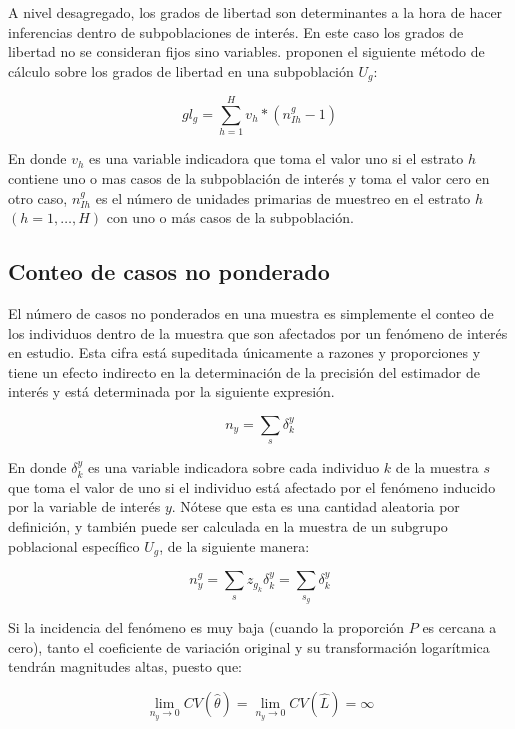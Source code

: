\documentclass[
  12pt,
]{book}
\begin{document}
A nivel desagregado, los grados de libertad son determinantes a la hora de hacer inferencias dentro de subpoblaciones de interés. En este caso los grados de libertad no se consideran fijos sino variables. \citet[p.~209]{Korn_Graubard_1999} proponen el siguiente método de cálculo sobre los grados de libertad en una subpoblación \(U_g\):

\[
gl_{g} = \sum_{h=1}^H v_h*(n_{Ih}^g - 1)
\]

En donde \(v_h\) es una variable indicadora que toma el valor uno si el estrato \(h\) contiene uno o mas casos de la subpoblación de interés y toma el valor cero en otro caso, \(n_{Ih}^g\) es el número de unidades primarias de muestreo en el estrato \(h\) \((h=1, \ldots, H)\) con uno o más casos de la subpoblación.

\hypertarget{conteo-de-casos-no-ponderado}{%
\subsection{Conteo de casos no ponderado}\label{conteo-de-casos-no-ponderado}}

El número de casos no ponderados en una muestra es simplemente el conteo de los individuos dentro de la muestra que son afectados por un fenómeno de interés en estudio. Esta cifra está supeditada únicamente a razones y proporciones y tiene un efecto indirecto en la determinación de la precisión del estimador de interés y está determinada por la siguiente expresión.

\[
n_y = \sum_{s}\delta_{k}^y
\]

En donde \(\delta_{k}^y\) es una variable indicadora sobre cada individuo \(k\) de la muestra \(s\) que toma el valor de uno si el individuo está afectado por el fenómeno inducido por la variable de interés \(y\). Nótese que esta es una cantidad aleatoria por definición, y también puede ser calculada en la muestra de un subgrupo poblacional específico \(U_g\), de la siguiente manera:

\[
n_y^g = \sum_{s}z_{g_k}\delta_{k}^y = \sum_{s_g}\delta_{k}^y
\]

Si la incidencia del fenómeno es muy baja (cuando la proporción \(P\) es cercana a cero), tanto el coeficiente de variación original y su transformación logarítmica tendrán magnitudes altas, puesto que:

\[
\lim_{n_y \rightarrow 0} CV(\hat \theta) = 
\lim_{n_y \rightarrow 0} CV(\hat L) = \infty
\]
\end{document}
